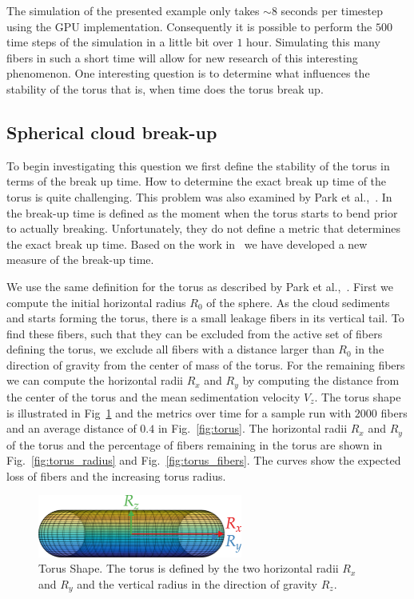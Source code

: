 The simulation of the presented example only takes ${\sim}8$ seconds per timestep using the GPU implementation. Consequently it is possible to perform the $500$ time steps of the simulation in a little bit over $1$ hour. Simulating this many fibers in such a short time will allow for new research of this interesting phenomenon. One interesting question is to determine what influences the stability of the torus that is, when time does the torus break up.

\subsection{Spherical cloud break-up}
\label{subsec:sphere_break}
To begin investigating this question we first define the stability of the torus in terms of the break up time. How to determine the exact break up time of the torus is quite challenging. This problem was also examined by Park et al.,~\cite{Park2010}. In~\cite{Park2010} the break-up time is defined as the moment when the torus starts to bend prior to actually breaking. Unfortunately, they do not define a metric that determines the exact break up time. Based on the work in~\cite{Park2010} we have developed a new measure of the break-up time.

We use the same definition for the torus as described by Park et al.,~\cite{Park2010}. First we compute the initial horizontal radius $R_0$ of the sphere. As the cloud sediments and starts forming the torus, there is a small leakage fibers in its vertical tail. To find these fibers, such that they can be excluded from the active set of fibers defining the torus, we exclude all fibers with a distance larger than $R_0$ in the direction of gravity from the center of mass of the torus. For the remaining fibers we can compute the horizontal radii $R_x$ and $R_y$ by computing the distance from the center of the torus and the mean sedimentation velocity $V_z$. The torus shape is illustrated in Fig~\ref{fig:torus_shape} and the metrics over time for a sample run with $2000$ fibers and an average distance of $0.4$ in Fig.~\ref{fig:torus}. The horizontal radii $R_x$ and $R_y$ of the torus and the percentage of fibers remaining in the torus are shown in Fig.~\ref{fig:torus_radius} and Fig.~\ref{fig:torus_fibers}. The curves show the expected loss of fibers and the increasing torus radius.

\begin{figure}[!htbp]
  \centering
  \includegraphics[width=0.6\textwidth]{img/torus3.png}
  \caption[Torus Shape.]{Torus Shape. The torus is defined by the two horizontal radii $R_x$ and $R_y$ and the vertical radius in the direction of gravity $R_z$.}
  \label{fig:torus_shape}
\end{figure}

